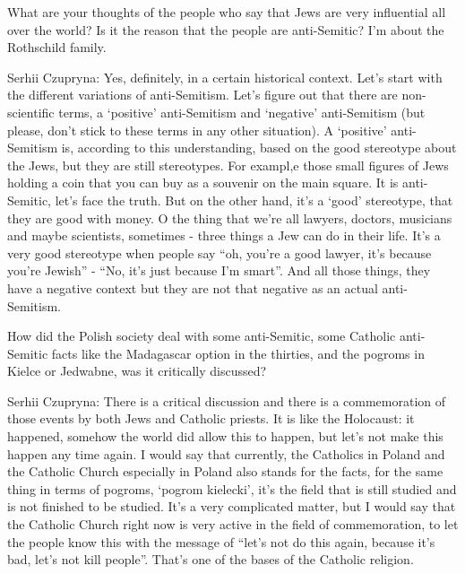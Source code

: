 What are your thoughts of the people who say that Jews are very influential all over the world? Is it the reason that the people are anti-Semitic? I’m about the Rothschild family.  

Serhii Czupryna: Yes, definitely, in a certain historical context. Let’s start with the different variations of anti-Semitism. Let’s figure out that there are non-scientific terms, a ‘positive’ anti-Semitism and ‘negative’ anti-Semitism (but please, don’t stick to these terms in any other situation). A ‘positive’ anti-Semitism is, according to this understanding, based on the good stereotype about the Jews, but they are still stereotypes. For exampl,e those small figures of Jews holding a coin that you can buy as a souvenir on the main square. It is anti-Semitic, let’s face the truth. But on the other hand, it’s a ‘good’ stereotype, that they are good with money. O the thing that we’re all lawyers, doctors, musicians and maybe scientists, sometimes - three things a Jew can do in their life. It’s a very good stereotype when people say “oh, you’re a good lawyer, it’s because you’re Jewish” - “No, it’s just because I’m smart”. And all those things, they have a negative context but they are not that negative as an actual anti-Semitism.  

How did the Polish society deal with some anti-Semitic, some Catholic anti-Semitic facts like the Madagascar option in the thirties, and the pogroms in Kielce or Jedwabne, was it critically discussed?     

Serhii Czupryna: There is a critical discussion and there is a commemoration of those events by both Jews and Catholic priests. It is like the Holocaust: it happened, somehow the world did allow this to happen, but let’s not make this happen any time again. I would say that currently, the Catholics in Poland and the Catholic Church especially in Poland also stands for the facts, for the same thing in terms of pogroms, ‘pogrom kielecki’, it’s the field that is still studied and is not finished to be studied. It’s a very complicated matter, but I would say that the Catholic Church right now is very active in the field of commemoration, to let the people know this with the message of “let’s not do this again, because it’s bad, let’s not kill people”. That’s one of the bases of the Catholic religion.  

 